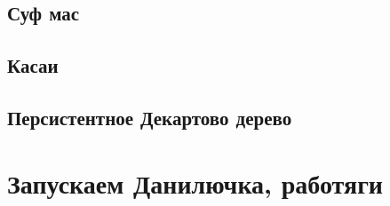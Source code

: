 \documentclass[14pt,a4paper,oneside]{article}
\begin{document}
\subsection{Суф мас}


\subsection{Касаи}


\subsection{Персистентное Декартово дерево}


\newpage
\section{Запускаем Данилючка, работяги}
{\fontsize{4}{4.8}\selectfont

}

\newpage
\end{document}
